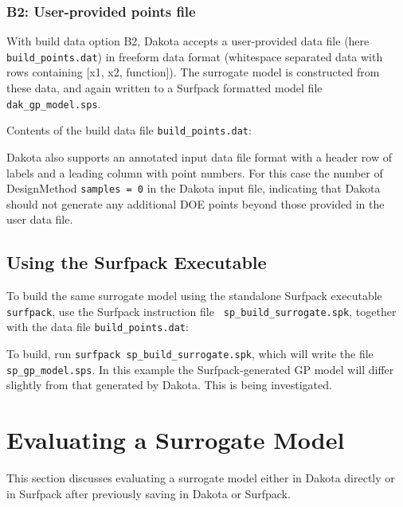 \documentclass{article}
\begin{document}
\subsubsection*{B2: User-provided points file}

With build data option B2, Dakota accepts a user-provided data file
(here {\tt build\_points.dat}) in freeform data format (whitespace
separated data with rows containing [x1, x2, function]).  The
surrogate model is constructed from these data, and again written to a
Surfpack formatted model file {\tt dak\_gp\_model.sps}.

Contents of the build data file {\tt build\_points.dat}:\\
\begin{bigbox}

\end{bigbox}

Dakota also supports an annotated input data file format with a header
row of labels and a leading column with point numbers.  For this case
the number of DesignMethod {\tt samples = 0} in the Dakota input file,
indicating that Dakota should not generate any additional DOE points
beyond those provided in the user data file.

\subsection{Using the Surfpack Executable}

To build the same surrogate model using the standalone Surfpack
executable {\tt surfpack}, use the Surfpack instruction file {\tt
  sp\_build\_surrogate.spk}, together with the data file 
{\tt build\_points.dat}:\\
\begin{bigbox}

\end{bigbox}

To build, run {\tt surfpack sp\_build\_surrogate.spk}, which will
write the file {\tt sp\_gp\_model.sps}.  In this example the
Surfpack-generated GP model will differ slightly from that generated
by Dakota.  This is being investigated.

\section{Evaluating a Surrogate Model}

This section discusses evaluating a surrogate model either in Dakota
directly or in Surfpack after previously saving in Dakota or Surfpack.
\end{document}
